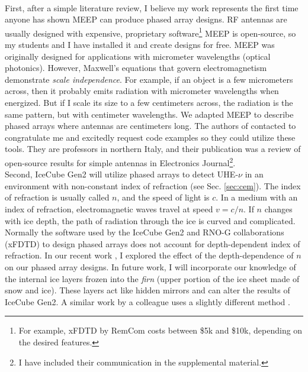 \documentclass[../../../main.tex]{subfiles}
\begin{document}
\\
\vspace{0.25cm}
First, after a simple literature review, I believe my work represents the first time anyone has shown MEEP can produce phased array designs.  RF antennas are usually designed with expensive, proprietary software\footnote{For example, xFDTD by RemCom costs between \$5k and \$10k, depending on the desired features.}  MEEP is open-source, so my students and I have installed it and create designs for free.  MEEP was originally designed for applications with micrometer wavelengths (optical photonics).  However, Maxwell's equations that govern electromagnetism demonstrate \textit{scale independence}.  For example, if an object is a few micrometers across, then it probably emits radiation with micrometer wavelengths when energized.  But if I scale its size to a few centimeters across, the radiation is the same pattern, but with centimeter wavelengths.  We adapted MEEP to describe phased arrays where antennas are centimeters long.  The authors of \cite{10.3390/electronics8121506} contacted to congratulate me and excitedly request code examples so they could utilize these tools.  They are professors in northern Italy, and their publication was a review of open-source results for simple antennas in Electronics Journal\footnote{I have included their communication in the supplemental material.}.
\\
\vspace{0.25cm}
Second, IceCube Gen2 will utilize phased arrays to detect UHE-$\nu$ in an environment with non-constant index of refraction (see Sec. \ref{sec:cem}).  The index of refraction is usually called $n$, and the speed of light is $c$.  In a medium with an index of refraction, electromagnetic waves travel at speed $v = c/n$.  If $n$ changes with ice depth, the path of radiation through the ice is curved and complicated.  Normally the software used by the IceCube Gen2 and RNO-G collaborations (xFDTD) to design phased arrays does not account for depth-dependent index of refraction. In our recent work \cite{electronics10040415}, I explored the effect of the depth-dependence of $n$ on our phased array designs.  In future work, I will incorporate our knowledge of the internal ice layers frozen into the \textit{firn} (upper portion of the ice sheet made of snow and ice).  These layers act like hidden mirrors and can alter the results of IceCube Gen2.  A similar work by a colleague uses a slightly different method \cite{prohira}.
\\
\vspace{0.25cm}
\end{document}
